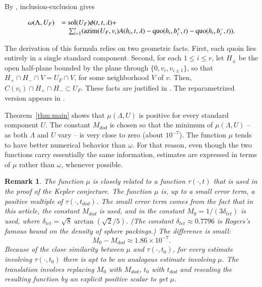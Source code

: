 \documentclass{article} %
\newtheorem{remark}[lemma]{Remark}
\begin{document}
By \cite[Eqn.~7.12]{Hales:2006:DCG}, inclusion-exclusion gives

\begin{equation}\label{eqn:in-ex-U}
  \begin{array}{lll}
    \omega(\Lambda,U_F) &= \operatorname{sol}(U_F) \phi(t,t,\lambda) + \\
    &\quad \sum_{i=1}^r ({\operatorname{azim}}(U_F,v_i) A(h_i,t,\lambda) - \operatorname{quo}(h_i,b_i^+,t) - 
    \operatorname{quo}(h_i,b_i^-,t)).
  \end{array}
\end{equation}

The derivation of this formula relies on two geometric facts. First,
each quoin lies entirely in a single standard component. Second, for
each $1\le i\le r$, let $H_{\pm}$ be the open half-plane bounded by
the plane through $\{0,v_i,v_{i\pm 1}\}$, so that $H_+\cap H_- \cap V
= U_F\cap V$, for some neighborhood $V$ of $v$. Then, $C(v_i)\cap
H_+\cap H_-\subset U_F$. These facts are justified in
\cite[Lemma~12.5]{Hales:2006:DCG}. The reparametrized version
appears in \cite{Hales:2002:Dodec}.

Theorem~\ref{thm:main} shows that $\mu(\Lambda,U)$ is positive
for every standard component $U$.  The constant
$M_{dod}$ is chosen so that the minimum of $\mu(\Lambda,U)$ -- as
both $\Lambda$ and $U$  vary -- is very close to zero (about $10^{-7}$).
The function $\mu$ tends to have better numerical behavior
than $\omega$.  For that reason, even though the two
functions carry essentially the same information,
estimates are expressed in terms
of $\mu$ rather than $\omega$, whenever possible.

\begin{remark}
  \label{rem:sq} 
  The function $\mu$ is closely related to a function $\tau(\cdot,t)$
  that is used in the proof of the Kepler conjecture. The function $\mu$
  is, up to a small error term, a positive multiple of
  $\tau(\cdot,t_{dod})$. The small error term comes from the fact that
  in this article, the constant $M_{dod}$ is used, and in
  \cite{Hales:2006:DCG} the constant $M_0=1/(3 \delta_{tet})$ is used,
  where $\delta_{tet} = \sqrt8 \arctan(\sqrt2/5)$. (The constant
  $\delta_{tet}\approx 0.7796$ is Rogers's famous bound on the density
  of sphere packings.) The difference is small:
  $$M_0 - M_{dod} \approx 1.86 \times 10^{-7}.$$
  Because of the close similarity between $\mu$ and $\tau(\cdot,t_0)$,
  for every estimate involving $\tau(\cdot,t_0)$ there is apt to be an
  analogous estimate involving $\mu$. The translation involves replacing
  $M_0$ with $M_{dod}$, $t_0$ with $t_{dod}$ and rescaling the resulting
  function by an explicit positive scalar to get $\mu$.
\end{remark}
\end{document}
